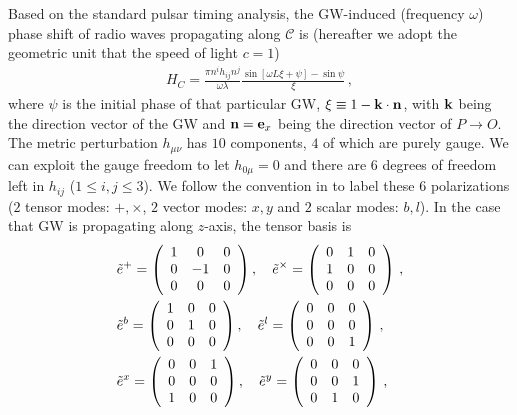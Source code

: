 \documentclass[prl,aps,floatfix,superscriptaddress,twocolumn]{revtex4}
\begin{document}
Based on the standard pulsar timing analysis, the GW-induced (frequency $\omega$)  phase shift of radio waves propagating along $\mathcal{C}$  is (hereafter we adopt the geometric unit that the speed of light $c=1$)
\begin{align}\label{eqc}
H_C = \frac{\pi n^i h_{ij} n^j}{\omega \lambda} \frac{\sin [\omega L \xi+\psi]-\sin \psi}{\xi}\,, 
\end{align}
where $\psi$ is the initial phase of that particular GW, $\xi \equiv 1-{\bf k}\cdot {\bf n}$, with ${\bf k}$ being the direction vector of the GW and ${\bf n}={\bf e}_x$ being the direction vector of $P\rightarrow O$. The metric perturbation $h_{\mu\nu}$ has $10$ components, $4$ of which are purely gauge. We can exploit the gauge freedom to let $h_{0\mu}=0$ and there are $6$ degrees of freedom left in $h_{ij}$ ($1 \le i,j \le 3$). We follow the convention in \cite{Nishizawa2009, Lee:2013} to label these $6$ polarizations ($2$ tensor modes: $+,\times$, $2$ vector modes: $x,y$ and $2$ scalar modes: $b, l$). In the case that GW is propagating along $z$-axis, the tensor basis  is
\begin{align}
&\tilde{e}^+
= 
\left (
\begin{array}{c c c}
1 & 0 & 0 \\
0 & -1 & 0 \\
0 & 0 & 0
\end{array}
\right ),\quad
\tilde{e}^\times
=\left (
\begin{array}{c c c}
0 & 1 & 0 \\
1 & 0 & 0 \\
0 & 0 & 0
\end{array}
\right )\,, \nonumber \\
&\tilde{e}^b
= 
\left (
\begin{array}{c c c}
1 & 0 & 0 \\
0 & 1 & 0 \\
0 & 0 & 0
\end{array}
\right ),\quad
\tilde{e}^l
=\left (
\begin{array}{c c c}
0 & 0 & 0 \\
0 & 0 & 0 \\
0 & 0 & 1
\end{array}
\right )\,, \nonumber \\
&\tilde{e}^x
= 
\left (
\begin{array}{c c c}
0 & 0 & 1 \\
0 & 0 & 0 \\
1 & 0 & 0
\end{array}
\right ),\quad
\tilde{e}^y
=\left (
\begin{array}{c c c}
0 & 0 & 0 \\
0 & 0 & 1 \\
0 & 1 & 0
\end{array}
\right )\,, 
\end{align}
\end{document}
